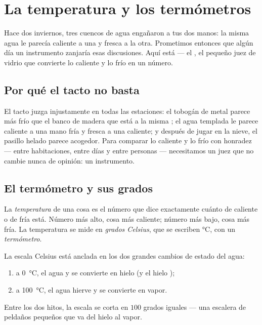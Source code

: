 \chapter{La temperatura y los termómetros}\label{ch:g3:temperature-thermometers}

Hace dos inviernos, tres cuencos de agua engañaron a tus dos manos: la
misma agua le parecía caliente a una y fresca a la otra. Prometimos
entonces que algún día un instrumento zanjaría esas discusiones. Aquí
está --- el , el pequeño juez de vidrio que convierte lo
caliente y lo frío en un número.

\section{Por qué el tacto no basta}

\begin{example}\label{ex:g3:temperature-thermometers:unfair}
El tacto juzga injustamente en todas las estaciones: el tobogán de
metal parece más frío que el banco de madera que está a la misma
; el agua templada le parece caliente a una mano fría y fresca a
una caliente; y después de jugar en la nieve, el pasillo helado parece
acogedor. Para comparar lo caliente y lo frío con honradez --- entre
habitaciones, entre días y entre personas --- necesitamos un juez que
no cambie nunca de opinión: un instrumento.
\end{example}

\section{El termómetro y sus grados}

\begin{definition}[La temperatura]\label{def:g3:temperature-thermometers:temperature}
La \emph{temperatura} de una cosa es el número que
dice exactamente cuánto de caliente o de fría está. Número más alto,
cosa más caliente; número más bajo, cosa más fría. La temperatura se
mide en \emph{grados Celsius}, que se escriben
\unit{\celsius}, con un \emph{termómetro}.
\end{definition}

\begin{proposition}\label{prop:g3:temperature-thermometers:milestones}
La escala Celsius está anclada en los dos grandes cambios de estado
del agua:
\begin{enumerate}
  \item a \qty{0}{\celsius}, el agua  y se convierte en
        hielo (y el hielo );
  \item a \qty{100}{\celsius}, el agua hierve y se convierte en
        vapor.
\end{enumerate}
Entre los dos hitos, la escala se corta en $100$ grados iguales ---
una escalera de peldaños pequeños que va del hielo al vapor.
\end{proposition}

